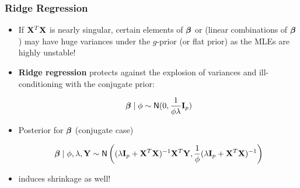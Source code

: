 \documentclass[]{beamer}
\begin{document}
\begin{frame}\frametitle{Ridge Regression}

\begin{itemize}

\item If $\mathbf{X}^T\mathbf{X}$ is nearly singular, certain  elements of $\boldsymbol{\beta}$ or (linear combinations of $\boldsymbol{\beta}$) may have huge variances under the $g$-prior (or flat prior) as the MLEs are highly unstable!


\item {\bf Ridge regression} protects against the explosion of variances and ill-conditioning with the conjugate prior:

$$\boldsymbol{\beta} \mid \phi \sim \textsf{N}(0, \frac{1}{\phi \lambda} \mathbf{I}_p)$$

\item Posterior for $\boldsymbol{\beta}$  (conjugate case)

$$\boldsymbol{\beta} \mid \phi, \lambda, \mathbf{Y} \sim \textsf{N} \left((\lambda \mathbf{I}_p + \mathbf{X}^T\mathbf{X})^{-1} \mathbf{X}^T \mathbf{Y},  \frac{1}{\phi}(\lambda \mathbf{I}_p + \mathbf{X}^T\mathbf{X})^{-1}\right)$$

\item induces shrinkage as well!
\end{itemize}
\end{frame}
\end{document}
